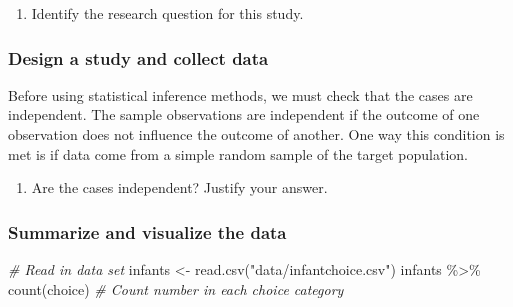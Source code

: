\documentclass[
]{report}
\newenvironment{Shaded}{\begin{snugshade}}{\end{snugshade}}
\newcommand{\CommentTok}[1]{\textcolor[rgb]{0.56,0.35,0.01}{\textit{#1}}}
\newcommand{\FunctionTok}[1]{\textcolor[rgb]{0.00,0.00,0.00}{#1}}
\newcommand{\NormalTok}[1]{#1}
\newcommand{\OtherTok}[1]{\textcolor[rgb]{0.56,0.35,0.01}{#1}}
\newcommand{\SpecialCharTok}[1]{\textcolor[rgb]{0.00,0.00,0.00}{#1}}
\newcommand{\StringTok}[1]{\textcolor[rgb]{0.31,0.60,0.02}{#1}}
\providecommand{\tightlist}{%
  \setlength{\itemsep}{0pt}\setlength{\parskip}{0pt}}
\begin{document}
\begin{enumerate}
\def\labelenumi{\arabic{enumi}.}
\setcounter{enumi}{2}
\tightlist
\item
  Identify the research question for this study.
\end{enumerate}

\vspace{1in}

\hypertarget{design-a-study-and-collect-data}{%
\subsubsection*{Design a study and collect data}\label{design-a-study-and-collect-data}}

Before using statistical inference methods, we must check that the cases are independent. The sample observations are independent if the outcome of one observation does not influence the outcome of another. One way this condition is met is if data come from a simple random sample of the target population.

\begin{enumerate}
\def\labelenumi{\arabic{enumi}.}
\setcounter{enumi}{3}
\tightlist
\item
  Are the cases independent? Justify your answer.
\end{enumerate}

\vspace{1in}

\newpage

\hypertarget{summarize-and-visualize-the-data}{%
\subsubsection*{Summarize and visualize the data}\label{summarize-and-visualize-the-data}}

\begin{Shaded}
\begin{Highlighting}[]
 \CommentTok{\# Read in data set}
\NormalTok{infants }\OtherTok{\textless{}{-}} \FunctionTok{read.csv}\NormalTok{(}\StringTok{"data/infantchoice.csv"}\NormalTok{)}
\NormalTok{infants }\SpecialCharTok{\%\textgreater{}\%} \FunctionTok{count}\NormalTok{(choice)  }\CommentTok{\# Count number in each choice category}
\end{Highlighting}
\end{Shaded}
\end{document}
